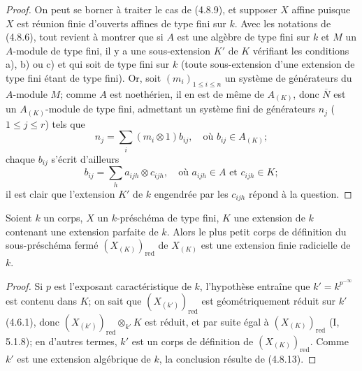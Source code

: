 \begin{proof}
On peut se borner à traiter le cas de (4.8.9), et supposer $X$ affine puisque
$X$ est réunion finie d'ouverts affines de type fini sur $k$. Avec les
notations de (4.8.6), tout revient à montrer que si $A$ est une algèbre de
type fini sur $k$ et $M$ un $A$-module de type fini, il y a une sous-extension
$K'$ de $K$ vérifiant les conditions a), b) ou c) et qui soit de type fini sur
$k$ (toute sous-extension d'une extension de type fini étant de type fini).
Or, soit $(m_i)_{1\leq i\leq n}$ un système de générateurs du $A$-module $M$;
comme $A$ est noethérien, il en est de même de $A_{(K)}$, donc $\overline N$
est un $A_{(K)}$-module de type fini, admettant un système fini de générateurs
$n_j$ ($1\leq j\leq r$) tels que
\[
n_j=\sum_i(m_i\otimes1)b_{ij},
\quad\text{où }b_{ij}\in A_{(K)};
\]
chaque $b_{ij}$ s'écrit d'ailleurs
\[
b_{ij}=\sum_h a_{ijh}\otimes c_{ijh},
\quad\text{où }a_{ijh}\in A\text{ et }c_{ijh}\in K;
\]
il est clair que l'extension $K'$ de $k$ engendrée par les $c_{ijh}$ répond à
la question.
\end{proof}

\begin{proposition}[4.8.14]
\label{IV.2.4.8.14-fr}
Soient $k$ un corps, $X$ un $k$-préschéma de type fini, $K$ une extension de
$k$ contenant une extension parfaite de $k$. Alors le plus petit corps de
définition du sous-préschéma fermé $(X_{(K)})_{\mathrm{red}}$ de $X_{(K)}$
est une extension finie radicielle de $k$.
\end{proposition}

\begin{proof}
Si $p$ est l'exposant caractéristique de $k$, l'hypothèse entraîne que
$k'=k^{p^{-\infty}}$ est contenu dans $K$; on sait que
$(X_{(k')})_{\mathrm{red}}$ est géométriquement réduit sur $k'$ (4.6.1), donc
$(X_{(k')})_{\mathrm{red}}\otimes_{k'}K$ est réduit, et par suite égal à
$(X_{(K)})_{\mathrm{red}}$ (I, 5.1.8); en d'autres termes, $k'$ est un corps
de définition de $(X_{(K)})_{\mathrm{red}}$. Comme $k'$ est une extension
algébrique de $k$, la conclusion résulte de (4.8.13).
\end{proof}

